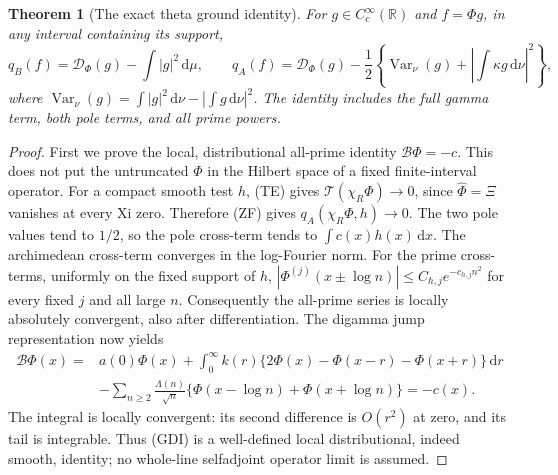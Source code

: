 \documentclass[11pt]{article}
\newtheorem{theorem}{Theorem}
\theoremstyle{remark}\newtheorem{remark}[theorem]{Remark}
\newcommand{\R}{\mathbb R}
\newcommand{\dd}{\,\mathrm d}
\begin{document}
\begin{theorem}[The exact theta ground identity]
\label{thm:theta-ground}
For $g\in C_c^\infty(\R)$ and $f=\Phi g$, in any interval
containing its support,
\[
 q_B(f)=\mathcal D_\Phi(g)-\int|g|^2\dd\mu,\qquad
 q_A(f)=\mathcal D_\Phi(g)
   -\frac12\left\{\operatorname{Var}_\nu(g)
               +\left|\int\kappa g\dd\nu\right|^2\right\},
                                                               \tag{TG}
\]
where
$\operatorname{Var}_\nu(g)=\int|g|^2\dd\nu-
|\int g\dd\nu|^2$. The identity includes the full gamma term,
both pole terms, and all prime powers.
\end{theorem}
\begin{proof}
First we prove the local, distributional all-prime identity
$\mathcal B\Phi=-c$. This does not put the untruncated $\Phi$
in the Hilbert space of a fixed finite-interval operator.
For a compact smooth test $h$, (TE) gives
$\mathcal T(\chi_R\Phi)\to0$, since $\widehat\Phi=\Xi$ vanishes
at every Xi zero. Therefore (ZF) gives
$q_A(\chi_R\Phi,h)\to0$.
The two pole values tend to $1/2$, so the pole cross-term
tends to $\int c(x)h(x)\dd x$.
The archimedean cross-term converges in the log-Fourier norm.
For the prime cross-terms, uniformly on the fixed support of $h$,
$|\Phi^{(j)}(x\pm\log n)|\le C_{h,j}e^{-c_{h,j}n^2}$
for every fixed $j$ and all large $n$. Consequently the all-prime
series is locally absolutely convergent, also after differentiation.
The digamma jump representation now yields
\[
 \begin{split}
 \mathcal B\Phi(x)={}&a(0)\Phi(x)
   +\int_0^\infty k(r)
        \{2\Phi(x)-\Phi(x-r)-\Phi(x+r)\}\dd r\\
 &-\sum_{n\ge2}\frac{\Lambda(n)}{\sqrt n}
        \{\Phi(x-\log n)+\Phi(x+\log n)\}=-c(x).
 \end{split}                                                 \tag{GDI}
\]
The integral is locally convergent: its second difference is
$O(r^2)$ at zero, and its tail is integrable.
Thus (GDI) is a well-defined local distributional, indeed smooth,
identity; no whole-line selfadjoint operator limit is assumed.


\end{proof}
\end{document}

